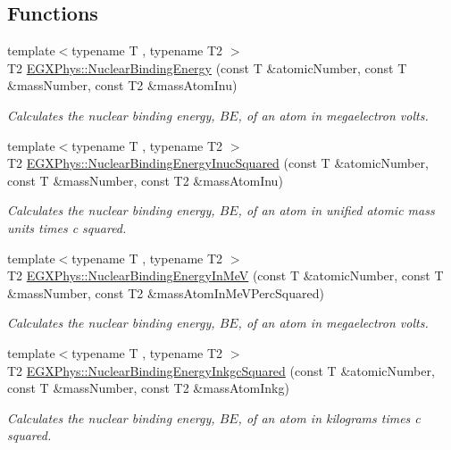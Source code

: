 \subsection*{Functions}
\begin{DoxyCompactItemize}
\item 
{\footnotesize template$<$typename T , typename T2 $>$ }\\T2 \mbox{\hyperlink{group___e_g_x_phys-_nuclear_binding_energy_gab6832bf15ead7b4e867e759e0a2a078e}{E\+G\+X\+Phys\+::\+Nuclear\+Binding\+Energy}} (const T \&atomic\+Number, const T \&mass\+Number, const T2 \&mass\+Atom\+Inu)
\begin{DoxyCompactList}\small\item\em Calculates the nuclear binding energy, $BE$, of an atom in megaelectron volts. \end{DoxyCompactList}\item 
{\footnotesize template$<$typename T , typename T2 $>$ }\\T2 \mbox{\hyperlink{group___e_g_x_phys-_nuclear_binding_energy_gafeed0fb7220e4900a8da011ed9fca44f}{E\+G\+X\+Phys\+::\+Nuclear\+Binding\+Energy\+Inuc\+Squared}} (const T \&atomic\+Number, const T \&mass\+Number, const T2 \&mass\+Atom\+Inu)
\begin{DoxyCompactList}\small\item\em Calculates the nuclear binding energy, $BE$, of an atom in unified atomic mass units times c squared. \end{DoxyCompactList}\item 
{\footnotesize template$<$typename T , typename T2 $>$ }\\T2 \mbox{\hyperlink{group___e_g_x_phys-_nuclear_binding_energy_ga25f5d2d32fad7e28e278cf8b5ea8ffa8}{E\+G\+X\+Phys\+::\+Nuclear\+Binding\+Energy\+In\+MeV}} (const T \&atomic\+Number, const T \&mass\+Number, const T2 \&mass\+Atom\+In\+Me\+V\+Perc\+Squared)
\begin{DoxyCompactList}\small\item\em Calculates the nuclear binding energy, $BE$, of an atom in megaelectron volts. \end{DoxyCompactList}\item 
{\footnotesize template$<$typename T , typename T2 $>$ }\\T2 \mbox{\hyperlink{group___e_g_x_phys-_nuclear_binding_energy_gaf229d8c0d2aa30ff95aa20e5213df3bd}{E\+G\+X\+Phys\+::\+Nuclear\+Binding\+Energy\+Inkgc\+Squared}} (const T \&atomic\+Number, const T \&mass\+Number, const T2 \&mass\+Atom\+Inkg)
\begin{DoxyCompactList}\small\item\em Calculates the nuclear binding energy, $BE$, of an atom in kilograms times c squared. \end{DoxyCompactList}\item 

\end{DoxyCompactItemize}
